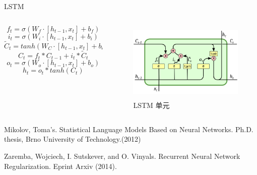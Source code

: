 \documentclass[aspectratio=169]{beamer}
\begin{document}
    \begin{frame}{LSTM}
      \begin{columns}
      \begin{column}[t]{0.5\textwidth}
        \begin{equation}
           f_t = \sigma(W_f \cdot [h_{t-1}, x_t] + b_f)
        \end{equation}
        \begin{equation}
           i_t = \sigma(W_i \cdot [h_{t-1}, x_t] + b_i)
        \end{equation}
        \begin{equation}
           \tilde{C}_t = tanh(W_C \cdot [h_{t-1}, x_t] + b_C) 
        \end{equation}
        \begin{equation}
           C_t = f_t * C_{t-1} + i_t * \tilde{C}_t
        \end{equation}
        \begin{equation}
           o_t = \sigma(W_o \cdot [h_{t-1}, x_t] + b_o)
        \end{equation}
        \begin{equation}
           h_t = o_t * tanh(C_t)
        \end{equation}
      \end{column}

      \begin{column}[t]{0.5\textwidth}
        \begin{figure}
        \includegraphics[height=1.5in, width=2.44in]{lstm2.png}
        \caption{LSTM 单元}
        \end{figure}
      \end{column}

      \end{columns}
      \vspace*{2em}

      \tiny
      Mikolov, Toma's. Statistical Language Models Based on Neural Networks. Ph.D. thesis, Brno University of Technology.(2012)

      Zaremba, Wojciech, I. Sutskever, and O. Vinyals. Recurrent Neural Network Regularization. Eprint Arxiv (2014).
    \end{frame}
\end{document}
